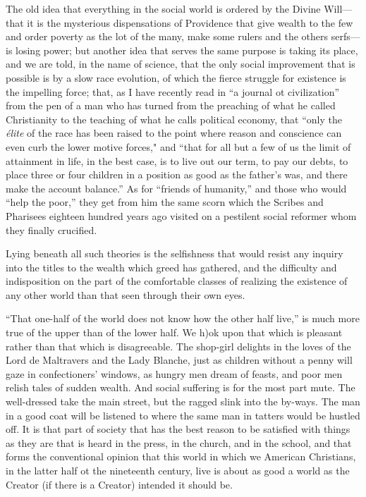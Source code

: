\documentclass{book}
\begin{document}
The old idea that everything in the social world is ordered by the Divine Will—that it is the mysterious dispensations of Providence that give wealth to the few and order poverty as the lot of the many, make some rulers and the others serfs—is losing power; but another idea that serves the same purpose is taking its place, and we are told, in the name of science, that the only social improvement that is possible is by a slow race evolution, of which the fierce struggle for existence is the impelling force; that, as I have recently read in “a journal ot civilization” from the pen of a man who has turned from the preaching of what he called Christianity to the teaching of what he calls political economy, that “only the \emph{élite} of the race has been raised to the point where reason and conscience can even curb the lower motive forces," and “that for all but a few of us the limit of attainment in life, in the best case, is to live out our term, to pay our debts, to place three or four children in a position as good as the father’s was, and there make the account balance.” As for “friends of humanity,” and those who would “help the poor,” they get from him the same scorn which the Scribes and Pharisees eighteen hundred years ago visited on a pestilent social reformer whom they finally crucified.

Lying beneath all such theories is the selfishness that would resist any inquiry into the titles to the wealth which greed has gathered, and the difficulty and indisposition on the part of the comfortable classes of realizing the existence of any other world than that seen through their own eyes.

“That one-half of the world does not know how the other half live,” is much more true of the upper than of the lower half. We h)ok upon that which is pleasant rather than that which is disagreeable. The shop-girl delights in the loves of the Lord de Maltravers and the Lady Blanche, just as children without a penny will gaze in confectioners’ windows, as hungry men dream of feasts, and poor men relish tales of sudden wealth. And social suffering is for the most part mute. The well-dressed take the main street, but the ragged slink into the by-ways. The man in a good coat will be listened to where the same man in tatters would be hustled off. It is that part of society that has the best reason to be satisfied with things as they are that is heard in the press, in the church, and in the school, and that forms the conventional opinion that this world in which we American Christians, in the latter half ot the nineteenth century, live is about as good a world as the Creator (if there is a Creator) intended it should be.
\end{document}

